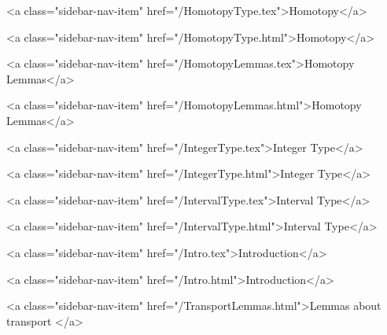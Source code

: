       
    
      
        
          <a class="sidebar-nav-item" href="/HomotopyType.tex">Homotopy</a>
        
      
    
      
        
          <a class="sidebar-nav-item" href="/HomotopyType.html">Homotopy</a>
        
      
    
      
        
          <a class="sidebar-nav-item" href="/HomotopyLemmas.tex">Homotopy Lemmas</a>
        
      
    
      
        
          <a class="sidebar-nav-item" href="/HomotopyLemmas.html">Homotopy Lemmas</a>
        
      
    
      
        
          <a class="sidebar-nav-item" href="/IntegerType.tex">Integer Type</a>
        
      
    
      
        
          <a class="sidebar-nav-item" href="/IntegerType.html">Integer Type</a>
        
      
    
      
        
          <a class="sidebar-nav-item" href="/IntervalType.tex">Interval Type</a>
        
      
    
      
        
          <a class="sidebar-nav-item" href="/IntervalType.html">Interval Type</a>
        
      
    
      
        
          <a class="sidebar-nav-item" href="/Intro.tex">Introduction</a>
        
      
    
      
        
          <a class="sidebar-nav-item" href="/Intro.html">Introduction</a>
        
      
    
      
        
          <a class="sidebar-nav-item" href="/TransportLemmas.html">Lemmas about transport </a>
        
